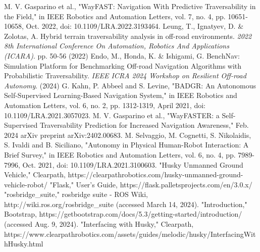 \documentclass[letterpaper, 10 pt, conference]{ieeeconf}  %
\begin{document}




\begin{thebibliography}{99}

 M. V. Gasparino et al., "WayFAST: Navigation With Predictive Traversability in the Field," in IEEE Robotics and Automation Letters, vol. 7, no. 4, pp. 10651-10658, Oct. 2022, doi: 10.1109/LRA.2022.3193464.
Leung, T., Ignatyev, D. \& Zolotas, A. Hybrid terrain traversability analysis in off-road environments. {\em 2022 8th International Conference On Automation, Robotics And Applications (ICARA)}. pp. 50-56 (2022)
Endo, M., Honda, K. \& Ishigami, G. BenchNav: Simulation Platform for Benchmarking Off-road Navigation Algorithms with Probabilistic Traversability. {\em IEEE ICRA 2024 Workshop on Resilient Off-road Autonomy}. (2024)
 G. Kahn, P. Abbeel and S. Levine, "BADGR: An Autonomous Self-Supervised Learning-Based Navigation System," in IEEE Robotics and Automation Letters, vol. 6, no. 2, pp. 1312-1319, April 2021, doi: 10.1109/LRA.2021.3057023.
 M. V. Gasparino et al., "WayFASTER: a Self-Supervised Traversability Prediction for Increased Navigation Awareness," Feb. 2024 arXiv preprint arXiv:2402.00683.
 M. Selvaggio, M. Cognetti, S. Nikolaidis, S. Ivaldi and B. Siciliano, "Autonomy in Physical Human-Robot Interaction: A Brief Survey," in IEEE Robotics and Automation Letters, vol. 6, no. 4, pp. 7989-7996, Oct. 2021, doi: 10.1109/LRA.2021.3100603.
"Husky Unmanned Ground Vehicle," Clearpath, https://clearpathrobotics.com/husky-unmanned-ground-vehicle-robot/
"Flask," User’s Guide, https://flask.palletsprojects.com/en/3.0.x/
"rosbridge\_suite," rosbridge suite - ROS Wiki, http://wiki.ros.org/rosbridge\_suite (accessed March 14, 2024).
"Introduction," Bootstrap, https://getbootstrap.com/docs/5.3/getting-started/introduction/ (accessed Aug. 9, 2024).
"Interfacing with Husky," Clearpath, https://www.clearpathrobotics.com/assets/guides/melodic/husky/InterfacingWithHusky.html






\end{thebibliography}
\end{document}
